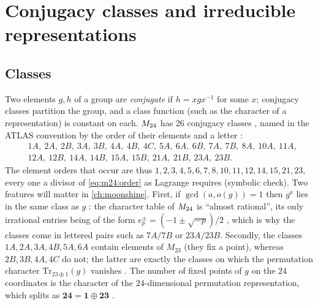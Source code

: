 \section{Conjugacy classes and irreducible representations}\label{sec:m24:chars}

\subsection*{Classes}
Two elements $g,h$ of a group are \emph{conjugate} if $h=xgx^{-1}$ for some $x$; conjugacy
classes partition the group, and a class function (such as the
character of a representation) is constant on each. $M_{24}$ has $26$ conjugacy classes
, named in the ATLAS convention by the order of their elements
and a letter :
\begin{equation}\label{eq:m24:classes}
\begin{aligned}
 &1A,\ 2A,\ 2B,\ 3A,\ 3B,\ 4A,\ 4B,\ 4C,\ 5A,\ 6A,\ 6B,\ 7A,\ 7B,\ 8A,\ 10A,\ 11A,\\
 &12A,\ 12B,\ 14A,\ 14B,\ 15A,\ 15B,\ 21A,\ 21B,\ 23A,\ 23B .
\end{aligned}
\end{equation}
The element orders that occur are thus $1,2,3,4,5,6,7,8,10,11,12,14,15,21,23$, every one a
divisor of \eqref{eq:m24:order} as Lagrange requires (symbolic check). Two features will
matter in \cref{ch:moonshine}. First, if $\gcd(a,o(g))=1$ then $g^a$ lies in the same class
as $g$ : the character table of
$M_{24}$ is ``almost rational'',
its only irrational entries being of the form $e_p^\pm=(-1\pm\sqrt{-p})/2$ , which is why the classes come in lettered pairs such as
$7A/7B$ or $23A/23B$. Secondly, the classes $1A,2A,3A,4B,5A,6A$ contain elements of $M_{23}$
(they fix a point), whereas $2B,3B,4A,4C$ do not; the latter are exactly the classes on
which the permutation character $\mathrm{Tr}_{23\oplus1}(g)$ vanishes . The number of fixed points of $g$ on the $24$ coordinates is the character of
the $24$-dimensional permutation representation, which splits as $\mathbf{24}=\mathbf1\oplus\mathbf{23}$
.

